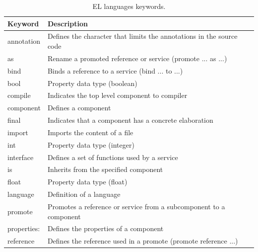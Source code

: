 \documentclass[11pt]{report}
\begin{document}
		
		\begin{table}[H]
			\centering
			\caption{EL languages keywords.}
			\label{tab:keywords}
			\begin{tabular}{l|l}
				\hline 
				\textbf{Keyword} & \textbf{Description} \\
				\hline
				annotation & Defines the character that limits the annotations in the source code \\
				
				as & Rename a promoted reference or service (promote ... as ...)\\
				
				bind & Binds a reference to a service (bind ... to ...)\\
				
				bool & Property data type (boolean)\\
				
				compile & Indicates the top level component to compiler\\
				
				component & Defines a component \\
				
				final & Indicates that a component has a concrete elaboration \\
				
				import & Imports the content of a file \\
				
				int & Property data type (integer) \\
				
				interface & Defines a set of functions used by a service \\
				
				is & Inherits from the specified component \\
				
				float & Property data type (float) \\
				
				language & Definition of a language \\
				
				promote & Promotes a reference or service from a subcomponent to a component \\
				
				properties: & Defines the properties of a component \\
				
				reference & Defines the reference used in a promote (promote reference ...)\\
				

\end{tabular}
\end{table}
\end{document}
